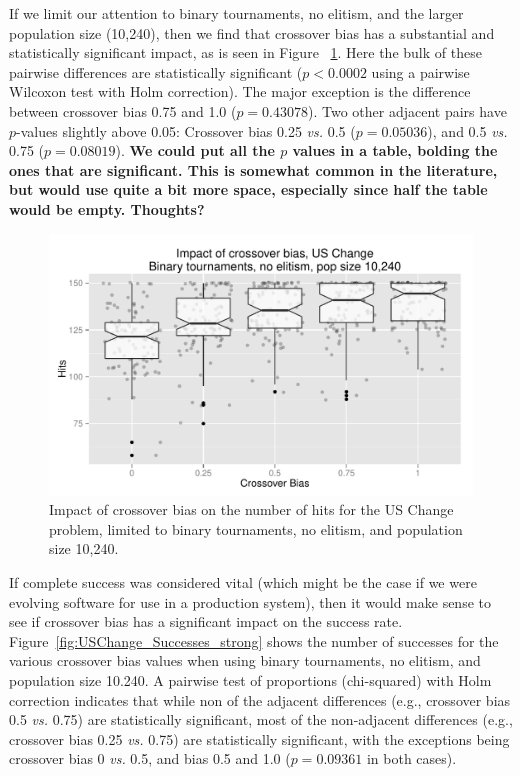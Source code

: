 \documentclass{sig-alternate}
\begin{document}
If we limit our attention to binary tournaments, no elitism, and the larger population size (10,240), then we find that 
crossover bias has a substantial and statistically significant impact, as is seen in Figure~
\ref{fig:USChange_Hits_strong}. Here the bulk of these pairwise differences are statistically significant ($p<0.0002$ 
using a pairwise Wilcoxon test with Holm correction). The major exception is the difference between crossover bias 
0.75 and 1.0 ($p=0.43078$). Two other adjacent pairs have $p$-values slightly above 0.05: Crossover bias 0.25 
\emph{vs.} 0.5 ($p=0.05036$), and 0.5 \emph{vs.} 0.75 ($p=0.08019$). \textbf{We could put all the $p$ values in a 
table, bolding the ones that are significant. This is somewhat common in the literature, but would use quite a bit more 
space, especially since half the table would be empty. Thoughts?}

\begin{figure}
\centering
\includegraphics[width=0.45 \textwidth]{Plots/US_change_hits_strong.pdf}
\caption{Impact of crossover bias on the number of hits for the US Change problem, limited to binary 
tournaments, no elitism, and population size 10,240.}
\label{fig:USChange_Hits_strong}
\end{figure}

%
%
%
%

If complete success was considered vital (which might be the case if we were evolving software for use in a 
production system), then it would make sense to see if crossover bias has a significant impact on the success rate. 
Figure~\ref{fig:USChange_Successes_strong} shows the number of successes for the various crossover bias values 
when using binary tournaments, no elitism, and population size 10.240. A pairwise test of proportions (chi-squared) 
with Holm correction indicates that while non of the adjacent differences (e.g., crossover bias 0.5 \emph{vs.} 0.75) are 
statistically significant, most of the non-adjacent differences (e.g., crossover bias 0.25 \emph{vs.} 0.75) are 
statistically significant, with the exceptions being crossover bias 0 \emph{vs.} 0.5, and bias 0.5 and 1.0 ($p=0.09361$ 
in both cases). 
\end{document}
